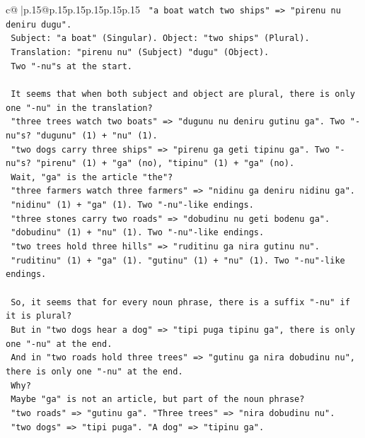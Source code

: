 \documentclass{article}
\begin{document}
{\begin{supertabular}{c@{$\;$}|p{.15\linewidth}@{}p{.15\linewidth}p{.15\linewidth}p{.15\linewidth}p{.15\linewidth}p{.15\linewidth}}
{{{\texttt{   "a boat watch two ships" => "pirenu nu deniru dugu".} \\
\texttt{   Subject: "a boat" (Singular). Object: "two ships" (Plural).} \\
\texttt{   Translation: "pirenu nu" (Subject) "dugu" (Object).} \\
\texttt{   Two "{-}nu"s at the start.} \\
\\ 
\texttt{   It seems that when both subject and object are plural, there is only one "{-}nu" in the translation?} \\
\texttt{   "three trees watch two boats" => "dugunu nu deniru gutinu ga". Two "{-}nu"s? "dugunu" (1) + "nu" (1).} \\
\texttt{   "two dogs carry three ships" => "pirenu ga geti tipinu ga". Two "{-}nu"s? "pirenu" (1) + "ga" (no), "tipinu" (1) + "ga" (no).} \\
\texttt{   Wait, "ga" is the article "the"?} \\
\texttt{   "three farmers watch three farmers" => "nidinu ga deniru nidinu ga".} \\
\texttt{   "nidinu" (1) + "ga" (1). Two "{-}nu"{-}like endings.} \\
\texttt{   "three stones carry two roads" => "dobudinu nu geti bodenu ga".} \\
\texttt{   "dobudinu" (1) + "nu" (1). Two "{-}nu"{-}like endings.} \\
\texttt{   "two trees hold three hills" => "ruditinu ga nira gutinu nu".} \\
\texttt{   "ruditinu" (1) + "ga" (1). "gutinu" (1) + "nu" (1). Two "{-}nu"{-}like endings.} \\
\\ 
\texttt{   So, it seems that for every noun phrase, there is a suffix "{-}nu" if it is plural?} \\
\texttt{   But in "two dogs hear a dog" => "tipi puga tipinu ga", there is only one "{-}nu" at the end.} \\
\texttt{   And in "two roads hold three trees" => "gutinu ga nira dobudinu nu", there is only one "{-}nu" at the end.} \\
\texttt{   Why?} \\
\texttt{   Maybe "ga" is not an article, but part of the noun phrase?} \\
\texttt{   "two roads" => "gutinu ga". "Three trees" => "nira dobudinu nu".} \\
\texttt{   "two dogs" => "tipi puga". "A dog" => "tipinu ga".} \\
}}}
\end{supertabular}}
\end{document}

